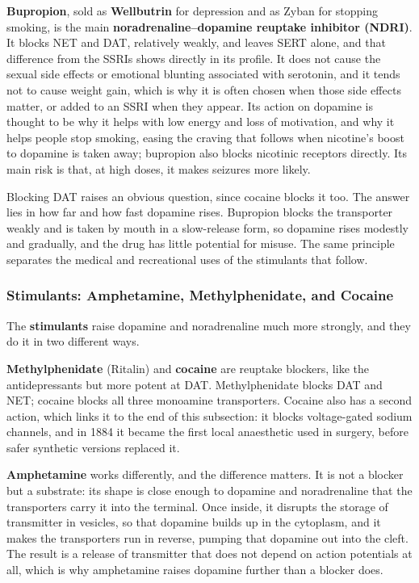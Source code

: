 \documentclass[11pt]{article}
\begin{document}
\textbf{Bupropion}, sold as \textbf{Wellbutrin} for depression and as Zyban for stopping smoking, is the main \textbf{noradrenaline--dopamine reuptake inhibitor (NDRI)}. It blocks NET and DAT, relatively weakly, and leaves SERT alone, and that difference from the SSRIs shows directly in its profile. It does not cause the sexual side effects or emotional blunting associated with serotonin, and it tends not to cause weight gain, which is why it is often chosen when those side effects matter, or added to an SSRI when they appear. Its action on dopamine is thought to be why it helps with low energy and loss of motivation, and why it helps people stop smoking, easing the craving that follows when nicotine's boost to dopamine is taken away; bupropion also blocks nicotinic receptors directly. Its main risk is that, at high doses, it makes seizures more likely.

Blocking DAT raises an obvious question, since cocaine blocks it too. The answer lies in how far and how fast dopamine rises. Bupropion blocks the transporter weakly and is taken by mouth in a slow-release form, so dopamine rises modestly and gradually, and the drug has little potential for misuse. The same principle separates the medical and recreational uses of the stimulants that follow.

\subsubsection{Stimulants: Amphetamine, Methylphenidate, and Cocaine}

The \textbf{stimulants} raise dopamine and noradrenaline much more strongly, and they do it in two different ways.

\textbf{Methylphenidate} (Ritalin) and \textbf{cocaine} are reuptake blockers, like the antidepressants but more potent at DAT. Methylphenidate blocks DAT and NET; cocaine blocks all three monoamine transporters. Cocaine also has a second action, which links it to the end of this subsection: it blocks voltage-gated sodium channels, and in 1884 it became the first local anaesthetic used in surgery, before safer synthetic versions replaced it.

\textbf{Amphetamine} works differently, and the difference matters. It is not a blocker but a substrate: its shape is close enough to dopamine and noradrenaline that the transporters carry it into the terminal. Once inside, it disrupts the storage of transmitter in vesicles, so that dopamine builds up in the cytoplasm, and it makes the transporters run in reverse, pumping that dopamine out into the cleft. The result is a release of transmitter that does not depend on action potentials at all, which is why amphetamine raises dopamine further than a blocker does.
\end{document}
